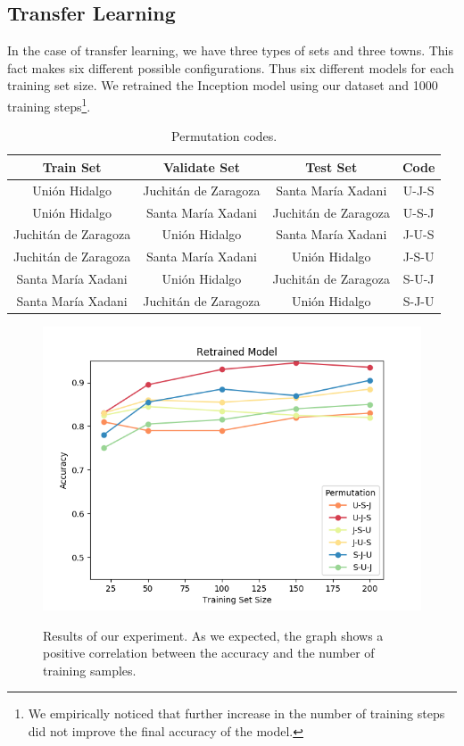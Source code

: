 \subsection{Transfer Learning}

In the case of transfer learning, we have three types of sets and three towns. This fact makes six different possible configurations. Thus six different models for each training set size. We retrained the Inception model using our dataset and 1000 training steps\footnote{We empirically noticed that further increase in the number of training steps did not improve the final accuracy of the model.}.\\

\begin{table}[h!]
  \caption{Permutation codes.}
  \begin{tabular}{|c|c|c|c|}
    \hline
    Train Set              &Validate Set           &Test Set               &Code  \\ \hline
    Uni\'on Hidalgo        &Juchit\'an de Zaragoza &Santa Mar\'ia Xadani   &U-J-S \\ \hline
    Uni\'on Hidalgo        &Santa Mar\'ia Xadani   &Juchit\'an de Zaragoza &U-S-J \\ \hline
    Juchit\'an de Zaragoza &Uni\'on Hidalgo        &Santa Mar\'ia Xadani   &J-U-S \\ \hline
    Juchit\'an de Zaragoza &Santa Mar\'ia Xadani   &Uni\'on Hidalgo        &J-S-U \\ \hline
    Santa Mar\'ia Xadani   &Uni\'on Hidalgo        &Juchit\'an de Zaragoza &S-U-J \\ \hline
    Santa Mar\'ia Xadani   &Juchit\'an de Zaragoza &Uni\'on Hidalgo        &S-J-U \\
    \hline
  \end{tabular}
\end{table}

\begin{figure}[h]
  \centering
  \includegraphics[width=1\textwidth]{images/validation-plot.png}
  \label{fig:validaton-plot}
  \caption{Results of our experiment. As we expected, the graph shows a positive correlation between the accuracy and the number of training samples.}
\end{figure}

